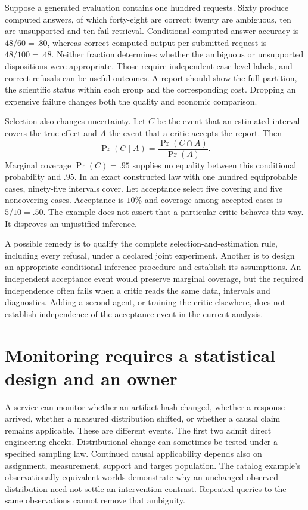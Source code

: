 Suppose a generated evaluation contains one hundred requests. Sixty produce
computed answers, of which forty-eight are correct; twenty are ambiguous,
ten are unsupported and ten fail retrieval. Conditional computed-answer
accuracy is \(48/60=.80\), whereas correct computed output per submitted
request is \(48/100=.48\). Neither fraction determines whether the ambiguous
or unsupported dispositions were appropriate. Those require independent
case-level labels, and correct refusals can be useful outcomes. A report
should show the full partition, the scientific status within each group and
the corresponding cost. Dropping an expensive failure changes both the quality
and economic comparison.
\citep{exec16_report_oracle}

Selection also changes uncertainty. Let \(C\) be the event that an estimated
interval covers the true effect and \(A\) the event that a critic accepts the
report. Then
\[
 \Pr(C\mid A)=\frac{\Pr(C\cap A)}{\Pr(A)}.
\]
Marginal coverage \(\Pr(C)=.95\) supplies no equality between this conditional
probability and \(.95\). In an exact constructed law with one hundred
equiprobable cases, ninety-five intervals cover. Let acceptance select five
covering and five noncovering cases. Acceptance is \(10\%\) and coverage among
accepted cases is \(5/10=.50\). The example does not assert that a particular
critic behaves this way. It disproves an unjustified inference.

A possible remedy is to qualify the complete selection-and-estimation rule,
including every refusal, under a declared joint experiment. Another is to
design an appropriate conditional inference procedure and establish its
assumptions. An independent acceptance event would preserve marginal
coverage, but the required independence often fails when a critic reads the
same data, intervals and diagnostics. Adding a second agent, or training the
critic elsewhere, does not establish independence of the acceptance event in
the current analysis.

\section{Monitoring requires a statistical design and an owner}

A service can monitor whether an artifact hash changed, whether a response
arrived, whether a measured distribution shifted, or whether a causal claim
remains applicable. These are different events. The first two admit direct
engineering checks. Distributional change can sometimes be tested under a
specified sampling law. Continued causal applicability depends also on
assignment, measurement, support and target population. The catalog example's
observationally equivalent worlds demonstrate why an unchanged observed
distribution need not settle an intervention contrast. Repeated queries to the
same observations cannot remove that ambiguity.
\citep{exec16_dh_exact}

